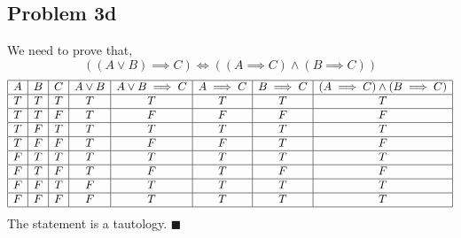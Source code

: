 \documentclass[answers]{exam}
\theoremstyle{mytheoremstyle}
\theoremstyle{mytheoremstyle}
\theoremstyle{myproblemstyle}
\begin{document}
\subsection*{Problem 3d}
\begin{framed}
	We need to prove that,
	\[\left((A\lor B)\implies C\right)\iff \left((A\implies C) \land (B\implies C)\right)\]
	\begin{displaymath}
		\begin{array}{|c|c|c|c|c|c|c|c|}
			\hline
			A & B & C & A\lor B & A\lor B\implies C & A\implies C & B\implies C & (A\implies C) \land (B\implies C) \\\hline
			T & T & T & T       & T                 & T           & T           & T                                 \\\hline
			T & T & F & T       & F                 & F           & F           & F                                 \\\hline
			T & F & T & T       & T                 & T           & T           & T                                 \\\hline
			T & F & F & T       & F                 & F           & T           & F                                 \\\hline
			F & T & T & T       & T                 & T           & T           & T                                 \\\hline
			F & T & F & T       & F                 & T           & F           & F                                 \\\hline
			F & F & T & F       & T                 & T           & T           & T                                 \\\hline
			F & F & F & F       & T                 & T           & T           & T                                 \\\hline
		\end{array}
	\end{displaymath}
	The statement is a tautology. \(\blacksquare\)
\end{framed}
\end{document}
